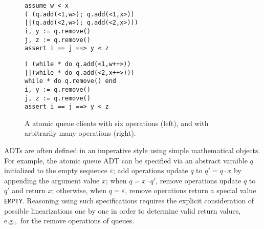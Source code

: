 \begin{figure}
  \begin{minipage}{0.49\linewidth}
    \begin{verbatim}
assume w < x
( (q.add(<1,w>); q.add(<1,x>))
||(q.add(<2,w>); q.add(<2,x>)))
i, y := q.remove()
j, z := q.remove()
assert i == j ==> y < z
    \end{verbatim}
  \end{minipage}
  \hfill
  \begin{minipage}{0.49\linewidth}
    \begin{verbatim}
( (while * do q.add(<1,w++>))
||(while * do q.add(<2,x++>)))
while * do q.remove() end
i, y := q.remove()
j, z := q.remove()
assert i == j ==> y < z
    \end{verbatim}
  \end{minipage}
  \caption{A atomic queue clients with six operations (left), and with
  arbitrarily-many operations (right).}
  \label{fig:clients}
\end{figure}

ADTs are often defined in an imperative style using simple mathematical objects.
For example, the atomic queue ADT can be specified via an abstract varaible $q$
initialized to the empty sequence $\varepsilon$; add operations update $q$ to
$q' = q \cdot x$ by appending the argument value $x$; when $q = x \cdot q'$,
remove operations update $q$ to $q'$ and return $x$; otherwise, when $q =
\varepsilon$, remove operations return a special value {\tt EMPTY}. Reasoning
using such specifications requires the explicit consideration of possible
linearizations one by one in order to determine valid return values, e.g.,~for
the remove operations of queues.

